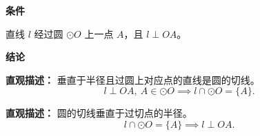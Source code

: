 \begin{statementbox}
	\textbf{\textcolor{CStatement}{条件}}
	\begin{description}[style=nextline, leftmargin=2.8em, labelsep=0.5em, itemsep=0.35em]
		\item[\textbf{\textcolor{CStatement}{条件 1（直线过圆上点）：}}]直线 $l$ 经过圆 $\odot O$ 上一点 $A$，且 $l \perp OA$。
	\end{description}

	\textbf{\textcolor{CStatement}{结论}}
	\begin{description}[style=nextline, leftmargin=2.8em, labelsep=0.5em, itemsep=0.45em]
		\item[\textbf{\textcolor{CStatement}{结论一（判定定理）：}}]
			\textbf{\textcolor{CStatement}{直观描述：}}
			垂直于半径且过圆上对应点的直线是圆的切线。
			\[
				l \perp OA,\ A \in \odot O \implies l \cap \odot O = \{A\}.
			\]

		\item[\textbf{\textcolor{CStatement}{推广结论（性质定理）：}}]
			\textbf{\textcolor{CStatement}{直观描述：}}
			圆的切线垂直于过切点的半径。
			\[
				l \cap \odot O = \{A\} \implies l \perp OA.
			\]
	\end{description}
\end{statementbox}
